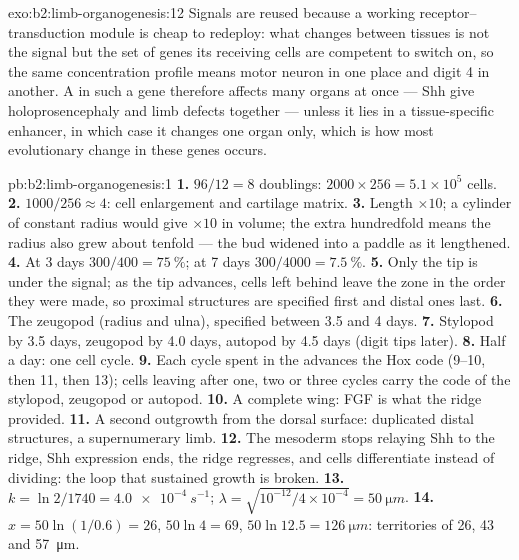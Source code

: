 \begin{solution}{exo:b2:limb-organogenesis:12}
Signals are reused because a working receptor--transduction module
is cheap to redeploy: what changes between tissues is not the
signal but the set of genes its receiving cells are competent to
switch on, so the same concentration profile means motor neuron in
one place and digit 4 in another. A  in such a gene
therefore affects many organs at once --- Shh  give
holoprosencephaly and limb defects together --- unless it lies in a
tissue-specific enhancer, in which case it changes one organ only,
which is how most evolutionary change in these genes occurs.
\end{solution}

\begin{solution}{pb:b2:limb-organogenesis:1}
\textbf{1.} $96/12 = 8$ doublings: $2000\times 256 = 5.1\times 10^{5}$
cells.
\textbf{2.} $1000/256 \approx 4$: cell enlargement and cartilage
matrix.
\textbf{3.} Length $\times 10$; a cylinder of constant radius would
give $\times 10$ in volume; the extra hundredfold means the radius
also grew about tenfold --- the bud widened into a paddle as it
lengthened.
\textbf{4.} At 3 days $300/400 = \qty{75}{\%}$; at 7 days $300/4000 =
\qty{7.5}{\%}$.
\textbf{5.} Only the tip is under the signal; as the tip advances,
cells left behind leave the zone in the order they were made, so
proximal structures are specified first and distal ones last.
\textbf{6.} The zeugopod (radius and ulna), specified between 3.5 and
4 days.
\textbf{7.} Stylopod by 3.5 days, zeugopod by 4.0 days, autopod by 4.5
days (digit tips later).
\textbf{8.} Half a day: one cell cycle.
\textbf{9.} Each cycle spent in the  advances the Hox
code (9--10, then 11, then 13); cells leaving after one, two or
three cycles carry the code of the stylopod, zeugopod or autopod.
\textbf{10.} A complete wing: FGF is what the ridge provided.
\textbf{11.} A second outgrowth from the dorsal surface: duplicated
distal structures, a supernumerary limb.
\textbf{12.} The mesoderm stops relaying Shh to the ridge, Shh
expression ends, the ridge regresses, and cells differentiate
instead of dividing: the loop that sustained growth is broken.
\textbf{13.} $k = \ln 2/1740 = \qty{4.0e-4}{s^{-1}}$; $\lambda =
\sqrt{10^{-12}/4\times 10^{-4}} = \qty{50}{\micro m}$.
\textbf{14.} $x = 50\ln(1/0.6) = 26$, $50\ln 4 = 69$, $50\ln 12.5 =
\qty{126}{\micro m}$: territories of 26, 43 and \qty{57}{\micro m}.

\end{solution}
